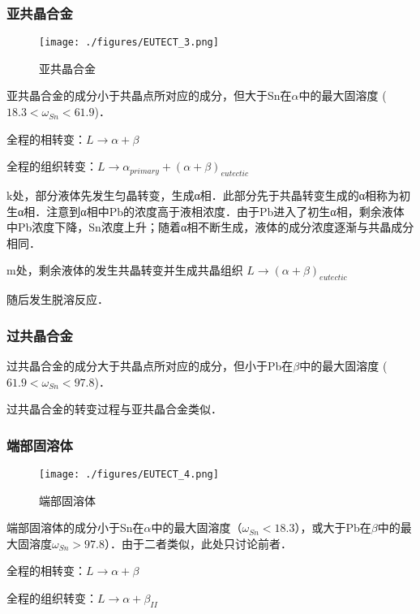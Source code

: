 \subsubsection{亚共晶合金}
\begin{figure}[ht]
\centering
\texttt{[image: ./figures/EUTECT\_3.png]}
\caption{亚共晶合金} \label{EUTECT_fig3}
\end{figure}

亚共晶合金的成分小于共晶点所对应的成分，但大于Sn在$\alpha$中的最大固溶度 ($18.3<\omega_{Sn}<61.9$)．

全程的相转变：$L \rightarrow \alpha+\beta$

全程的组织转变：$L \rightarrow \alpha_{primary}+(\alpha+\beta)_{eutectic}$

k处，部分液体先发生匀晶转变，生成α相．此部分先于共晶转变生成的α相称为初生α相．注意到α相中Pb的浓度高于液相浓度．由于Pb进入了初生α相，剩余液体中Pb浓度下降，Sn浓度上升；随着α相不断生成，液体的成分浓度逐渐与共晶成分相同．

m处，剩余液体的发生共晶转变并生成共晶组织 $L \rightarrow (\alpha+\beta)_{eutectic}$

随后发生脱溶反应．

\subsubsection{过共晶合金}
过共晶合金的成分大于共晶点所对应的成分，但小于Pb在$\beta$中的最大固溶度 ($61.9<\omega_{Sn}<97.8$)．

过共晶合金的转变过程与亚共晶合金类似．

\subsubsection{端部固溶体}
\begin{figure}[ht]
\centering
\texttt{[image: ./figures/EUTECT\_4.png]}
\caption{端部固溶体} \label{EUTECT_fig4}
\end{figure}
端部固溶体的成分小于Sn在$\alpha$中的最大固溶度（$\omega_{Sn}<18.3$），或大于Pb在$\beta$中的最大固溶度$\omega_{Sn}>97.8$）．由于二者类似，此处只讨论前者．

全程的相转变：$L \rightarrow \alpha+\beta$

全程的组织转变：$L \rightarrow \alpha+ \beta_{II}$
